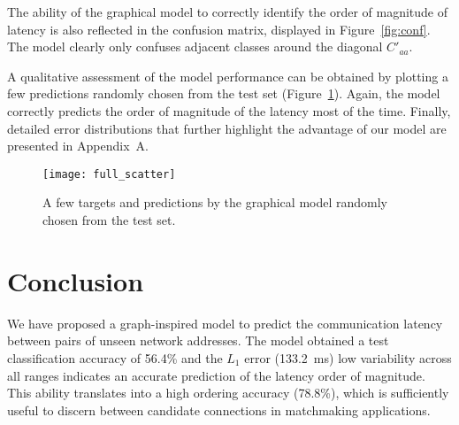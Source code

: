 \documentclass[10pt,a4paper,notitlepage,twocolumn]{article}
\begin{document}
The ability of the graphical model to correctly identify the order of magnitude of latency is also reflected in the confusion matrix, displayed in Figure~\ref{fig:conf}.
The model clearly only confuses adjacent classes around the diagonal $C'_{aa}$.

A qualitative assessment of the model performance can be obtained by plotting a few predictions randomly chosen from the test set (Figure~\ref{fig:samples}).
Again, the model correctly predicts the order of magnitude of the latency most of the time.
%
Finally, detailed error distributions that further highlight the advantage of our model are presented in Appendix~A.





\begin{figure}[h]
\centering
\texttt{[image: full\_scatter]}
\caption{A few targets and predictions by the graphical model randomly chosen from the test set.}
\label{fig:samples}
\end{figure}


\section{Conclusion}

We have proposed a graph-inspired model to predict the communication latency between pairs of unseen network addresses.
The model obtained a test classification accuracy of 56.4\% and the $L_1$ error (133.2~ms) low variability across all ranges indicates an accurate prediction of the latency order of magnitude.
This ability translates into a high ordering accuracy (78.8\%), which is sufficiently useful to discern between candidate connections in matchmaking applications.
\end{document}
